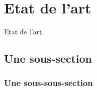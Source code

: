 \section{Etat de l'art}

Etat de l'art
\subsection{Une sous-section}
\subsubsection{Une sous-sous-section}